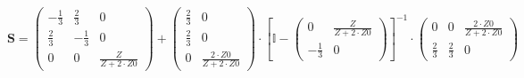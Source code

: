 \[ \mathbf{S} = \left(\begin{array}{ccc} -\frac{1}{3} & \frac{2}{3} & 0 \\ \frac{2}{3} & -\frac{1}{3} & 0 \\ 0 & 0 & \frac{Z}{Z+2\cdot Z0} \end{array}\right) + \left(\begin{array}{cc} \frac{2}{3} & 0 \\ \frac{2}{3} & 0 \\ 0 & \frac{2\cdot Z0}{Z+2\cdot Z0} \end{array}\right) \cdot \left[ \mathbb{I}  - \left(\begin{array}{cc} 0 & \frac{Z}{Z+2\cdot Z0} \\ -\frac{1}{3} & 0 \end{array}\right) \right]^{-1} \cdot\left(\begin{array}{ccc} 0 & 0 & \frac{2\cdot Z0}{Z+2\cdot Z0} \\ \frac{2}{3} & \frac{2}{3} & 0 \end{array}\right) \]
